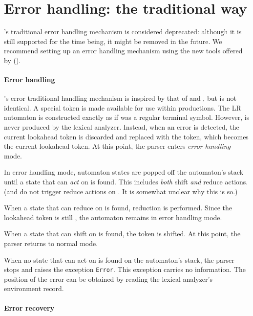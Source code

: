 \documentclass[onecolumn,11pt,nocopyrightspace,preprint]{sigplanconf}
\begin{document}

\section{Error handling: the traditional way}
\label{sec:errors}

\menhir's traditional error handling mechanism is considered deprecated: although
it is still supported for the time being, it might be removed in the future.
We recommend setting up an error handling mechanism using the new tools
offered by \menhir ().

\paragraph{Error handling}

\menhir's error traditional handling mechanism is inspired by that of \yacc and
\ocamlyacc, but is not identical. A special \error token is made available
for use within productions. The LR automaton is constructed exactly as if
\error was a regular terminal symbol. However, \error is never produced
by the lexical analyzer. Instead, when an error is detected, the current
lookahead token is discarded and replaced with the \error token, which becomes
the current lookahead token. At this point, the parser enters \emph{error
handling} mode.

In error handling mode, automaton states are popped off the automaton's stack
until a state that can \emph{act} on \error is found. This includes
\emph{both} shift \emph{and} reduce actions. (\yacc and \ocamlyacc do not
trigger reduce actions on \error. It is somewhat unclear why this is so.)

When a state that can reduce on \error is found, reduction is performed.
Since the lookahead token is still \error, the automaton remains in error
handling mode.

When a state that can shift on \error is found, the \error token is shifted.
At this point, the parser returns to normal mode.

When no state that can act on \error is found on the automaton's stack, the
parser stops and raises the exception \texttt{Error}. This exception carries
no information. The position of the error can be obtained by reading the
lexical analyzer's environment record.

\paragraph{Error recovery}
\end{document}
